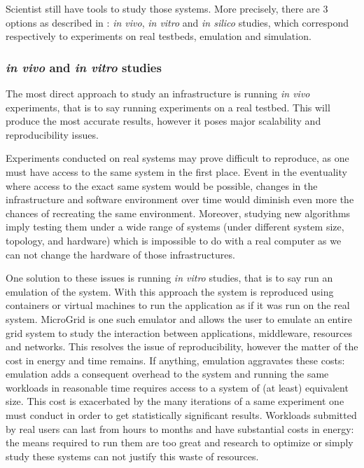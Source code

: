 Scientist still have tools to study those systems. More precisely, there are 3
options as described in \cite{legrand2015scheduling}: \textit{in vivo},
\textit{in vitro} and \textit{in silico} studies, which correspond respectively
to experiments on real testbeds, emulation and simulation.  


\subsubsection{\textit{in vivo} and \textit{in vitro} studies}

The most direct approach to study an infrastructure is running \textit{in vivo}
experiments, that is to say running experiments on a real testbed. This will
produce the most accurate results, however it poses major scalability and
reproducibility issues.

Experiments conducted on real systems may prove difficult to reproduce, as one
must have access to the same system in the first place. Event in the
eventuality where access to the exact same system would be possible, changes in
the infrastructure and software environment over time would diminish even more
the chances of recreating the same environment. Moreover, studying new
algorithms imply testing them under a wide range of systems (under different
system size, topology, and hardware) which is impossible to do with a real
computer as we can not change the hardware of those infrastructures.

One solution to these issues is running \textit{in vitro} studies, that is to
say run an emulation of the system. With this approach the system is reproduced
using containers or virtual machines to run the application as if it was run on
the real system. MicroGrid \cite{microgrid} is one such emulator and allows the
user to emulate an entire grid system to study the interaction between
applications, middleware, resources and networks. This resolves the issue of
reproducibility, however the matter of the cost in energy and time remains. If
anything, emulation aggravates these costs: emulation adds a consequent
overhead to the system and running the same workloads in reasonable time
requires access to a system of (at least) equivalent size.  This cost is
exacerbated by the many iterations of a same experiment one must conduct in
order to get statistically significant results.  Workloads submitted by real
users can last from hours to months and have substantial costs in energy: the
means required to run them are too great and research to optimize or simply
study these systems can not justify this waste of resources.

